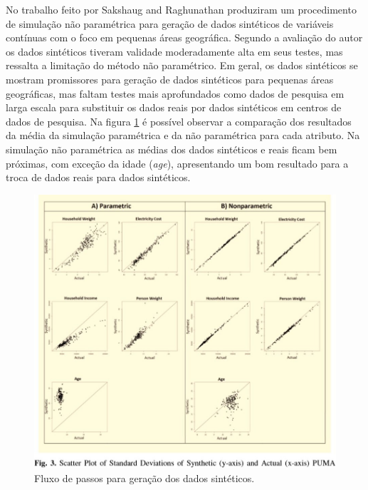 \documentclass[
	12pt,				%
	openright,			%
	twoside,			%
	a4paper,			%
	english,			%
	brazil				%
	]{abntex2}
\begin{document}
		No trabalho feito por Sakshaug and Raghunathan produziram um procedimento de simulação não paramétrica para geração de dados sintéticos de variáveis contínuas com o foco em pequenas áreas geográfica. 
		Segundo a avaliação do autor os dados sintéticos tiveram validade moderadamente alta em seus testes, mas ressalta a limitação do método não paramétrico. 
		Em geral, os dados sintéticos se mostram promissores para geração de dados sintéticos para pequenas áreas geográficas, mas faltam testes mais aprofundados como dados de pesquisa em larga escala para substituir os dados reais por dados sintéticos em centros de dados de pesquisa.
		Na figura \ref{fig:SakshaugandRaghunathan} é possível observar a comparação dos resultados da média da simulação paramétrica e da não paramétrica para cada atributo.
		Na simulação não paramétrica as médias dos dados sintéticos e reais ficam bem próximas, com exceção da idade (\emph{age}), apresentando um bom resultado para a troca de dados reais para dados sintéticos.
		\begin{figure}[h!]
			\centering
			\includegraphics[width=\linewidth]{./figures/TrabalhosRelacionados/SakshaugandRaghunathan.jpg}
			\caption{Fluxo de passos para geração dos dados sintéticos.}
			\label{fig:SakshaugandRaghunathan}
		\end{figure}
\end{document}
